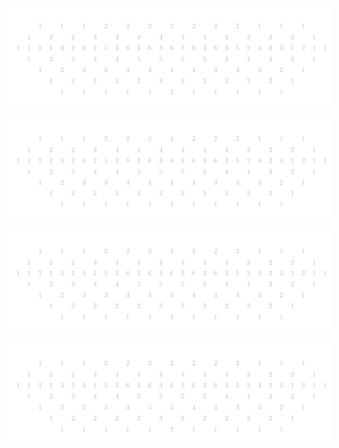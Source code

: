 \documentclass[a4paper]{article}
\begin{document}
\newpage

\vspace*{1cm} %

\begin{center}
    \includegraphics[width=0.8\textwidth]{h_E8gray.pdf} %
\end{center}

\vspace{1cm} %

\begin{center}
    \includegraphics[width=0.8\textwidth]{h_E8gray.pdf} %
\end{center}

\vspace{1cm} %

\begin{center}
    \includegraphics[width=0.8\textwidth]{h_E8gray.pdf} %
\end{center}

\vspace{1cm} %

\begin{center}
    \includegraphics[width=0.8\textwidth]{h_E8gray.pdf} %
\end{center}
\end{document}
